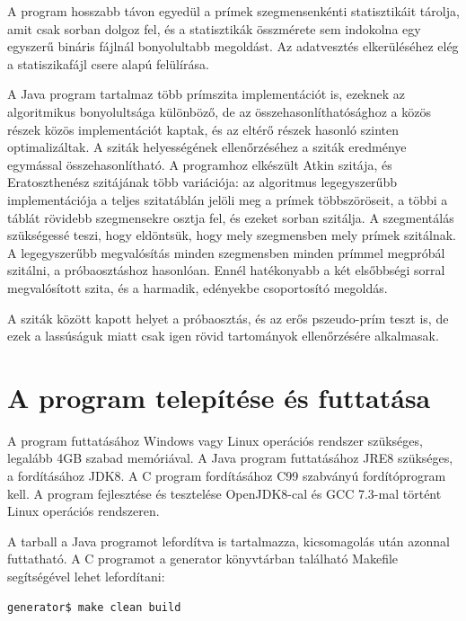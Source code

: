 \documentclass[12pt]{report}
\begin{document}
A program hosszabb távon egyedül a prímek szegmensenkénti statisztikáit tárolja,
amit csak sorban dolgoz fel, és a statisztikák összmérete sem indokolna
egy egyszerű bináris fájlnál bonyolultabb megoldást. Az adatvesztés elkerüléséhez
elég a statiszikafájl csere alapú felülírása.

A Java program tartalmaz több prímszita implementációt is, ezeknek az algoritmikus
bonyolultsága különböző, de az összehasonlíthatósághoz a közös részek közös
implementációt kaptak, és az eltérő részek hasonló szinten optimalizáltak.
A sziták helyességének ellenőrzéséhez a sziták eredménye egymással összehasonlítható.
A programhoz elkészült Atkin szitája, és Eratoszthenész szitájának több variációja:
az algoritmus legegyszerűbb implementációja a teljes szitatáblán jelöli meg
a prímek többszöröseit, a többi a táblát rövidebb szegmensekre osztja fel,
és ezeket sorban szitálja. A szegmentálás szükségessé teszi, hogy eldöntsük,
hogy mely szegmensben mely prímek szitálnak. A legegyszerűbb megvalósítás
minden szegmensben minden prímmel megpróbál szitálni, a próbaosztáshoz hasonlóan.
Ennél hatékonyabb a két elsőbbségi sorral megvalósított szita, és a harmadik,
edényekbe csoportosító megoldás.

A sziták között kapott helyet a próbaosztás, és az erős pszeudo-prím teszt is,
de ezek a lassúságuk miatt csak igen rövid tartományok ellenőrzésére alkalmasak.


\section{A program telepítése és futtatása}

A program futtatásához Windows vagy Linux operációs rendszer szükséges,
legalább 4GB szabad memóriával.
A Java program futtatásához JRE8 szükséges, a fordításához JDK8.
A C program fordításához C99 szabványú fordítóprogram kell.  %
A program fejlesztése és tesztelése OpenJDK8-cal és GCC 7.3-mal történt
Linux operációs rendszeren.

A tarball a Java programot lefordítva is tartalmazza,
kicsomagolás után azonnal futtatható.
A C programot a generator könyvtárban található Makefile segítségével lehet lefordítani:
{\tiny
\begin{lstlisting}[language=bash]
generator$ make clean build
\end{lstlisting}
}
\end{document}
